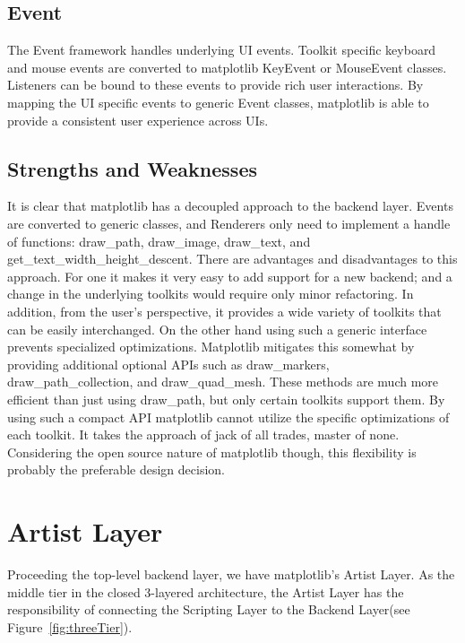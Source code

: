 \documentclass[pdftex,10pt,a4paper]{report}
\begin{document}
\subsection{Event}
The Event framework handles underlying UI events. Toolkit specific keyboard and mouse events are converted to matplotlib KeyEvent or MouseEvent classes. Listeners can be bound to these events to provide rich user interactions. By mapping the UI specific events to generic Event classes, matplotlib is able to provide a consistent user experience across UIs.

\subsection{Strengths and Weaknesses}
It is clear that matplotlib has a decoupled approach to the backend layer. Events are converted to generic classes, and Renderers only need to implement a handle of functions: draw\_path, draw\_image, draw\_text, and get\_text\_width\_height\_descent. There are advantages and disadvantages to this approach. For one it makes it very easy to add support for a new backend; and a change in the underlying toolkits would require only minor refactoring. In addition, from the user's perspective, it provides a wide variety of toolkits that can be easily interchanged. On the other hand using such a generic interface prevents specialized optimizations. Matplotlib mitigates this somewhat by providing additional optional APIs such as draw\_markers, draw\_path\_collection, and draw\_quad\_mesh. These methods are much more efficient than just using draw\_path, but only certain toolkits support them. By using such a compact API matplotlib cannot utilize the specific optimizations of each toolkit. It takes the approach of jack of all trades, master of none. Considering the open source nature of matplotlib though, this flexibility is probably the preferable design decision.

\section{Artist Layer}

Proceeding the top-level backend layer, we have matplotlib's Artist Layer. As the middle tier in the closed 3-layered architecture, the Artist Layer has the responsibility of connecting the Scripting Layer to the Backend Layer(see Figure~\ref{fig:threeTier}). 
\end{document}

